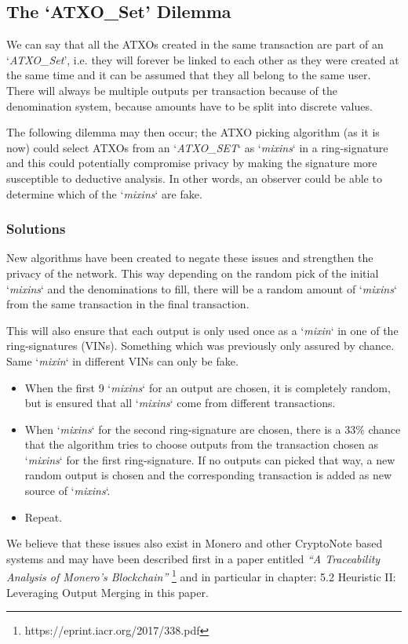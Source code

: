 \subsection{The ‘ATXO\_Set’ Dilemma}

We can say that all the ATXOs created in the same transaction are part
of an ‘\textit{ATXO\_Set}’, i.e. they will forever be linked to each
other as they were created at the same time and it can be assumed that
they all belong to the same user. There will always be multiple outputs
per transaction because of the denomination system, because amounts
have to be split into discrete values.



The following dilemma may then occur; the ATXO picking algorithm (as it is
now) could select ATXOs from an ‘\textit{ATXO\_SET}‘ as ‘\textit{mixins}‘
in a ring-signature and this could potentially compromise privacy by making
the signature more susceptible to deductive analysis. In other words, an
observer could be able to determine which of the ‘\textit{mixins}‘ are fake.



\subsubsection{Solutions}
New algorithms have been created to negate these issues and strengthen the
privacy of the network. This way depending on the random pick of the initial
‘\textit{mixins}‘ and the denominations to fill, there will be a random
amount of ‘\textit{mixins}‘ from the same transaction in the final transaction.



This will also ensure that each output is only used once as a ‘\textit{mixin}‘
in one of the ring-signatures (VINs). Something which was previously only
assured by chance. Same ‘\textit{mixin}‘ in different VINs can only be fake.



\begin{itemize}
	\item When the first 9 ‘\textit{mixins}‘ for an output are chosen, it is
	completely random, but is ensured that all ‘\textit{mixins}‘ come from
	different transactions.
	\item When ‘\textit{mixins}‘ for the second ring-signature are chosen,
	there is a 33\% chance that the algorithm tries to 	choose outputs from
	the transaction chosen as ‘\textit{mixins}‘ for the first ring-signature.
	If no outputs can 	picked that way, a new random output is chosen and
	the corresponding transaction is added as new source of ‘\textit{mixins}‘.
	\item Repeat.
\end{itemize}



We believe that these issues also exist in Monero and other CryptoNote based
systems and may have been described first in a paper entitled
\textit{“A Traceability Analysis of Monero’s Blockchain”}
\footnote{https://eprint.iacr.org/2017/338.pdf} and in particular in
chapter: 5.2 Heuristic II: Leveraging Output Merging in this paper.
